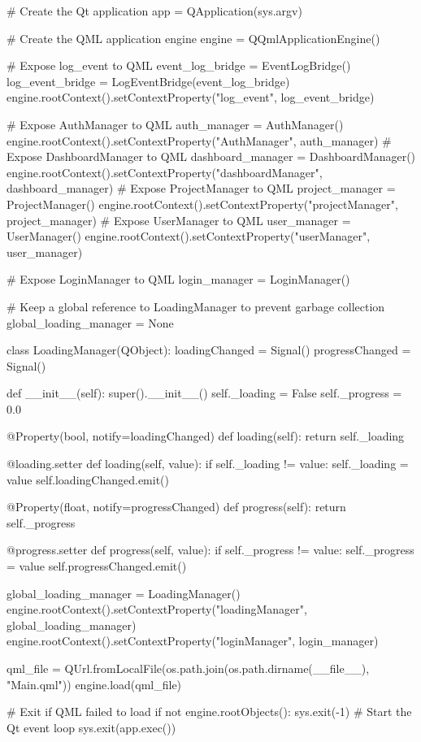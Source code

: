 \documentclass{report}
\begin{document}
\begin{python}
    # Create the Qt application
    app = QApplication(sys.argv)

    # Create the QML application engine
    engine = QQmlApplicationEngine()

    # Expose log_event to QML
    event_log_bridge = EventLogBridge()
    log_event_bridge = LogEventBridge(event_log_bridge)
    engine.rootContext().setContextProperty("log_event", log_event_bridge)

    # Expose AuthManager to QML
    auth_manager = AuthManager()
    engine.rootContext().setContextProperty("AuthManager", auth_manager)
    # Expose DashboardManager to QML
    dashboard_manager = DashboardManager()
    engine.rootContext().setContextProperty("dashboardManager", dashboard_manager)
    # Expose ProjectManager to QML
    project_manager = ProjectManager()
    engine.rootContext().setContextProperty("projectManager", project_manager)
    # Expose UserManager to QML
    user_manager = UserManager()
    engine.rootContext().setContextProperty("userManager", user_manager)

    # Expose LoginManager to QML
    login_manager = LoginManager()

# Keep a global reference to LoadingManager to prevent garbage collection
global_loading_manager = None

class LoadingManager(QObject):
    loadingChanged = Signal()
    progressChanged = Signal()

    def __init__(self):
        super().__init__()
        self._loading = False
        self._progress = 0.0

    @Property(bool, notify=loadingChanged)
    def loading(self):
        return self._loading

    @loading.setter
    def loading(self, value):
        if self._loading != value:
            self._loading = value
            self.loadingChanged.emit()

    @Property(float, notify=progressChanged)
    def progress(self):
        return self._progress

    @progress.setter
    def progress(self, value):
        if self._progress != value:
            self._progress = value
            self.progressChanged.emit()

global_loading_manager = LoadingManager()
engine.rootContext().setContextProperty("loadingManager", global_loading_manager)
engine.rootContext().setContextProperty("loginManager", login_manager)

qml_file = QUrl.fromLocalFile(os.path.join(os.path.dirname(__file__), "Main.qml"))
engine.load(qml_file)

# Exit if QML failed to load
if not engine.rootObjects():
    sys.exit(-1)
# Start the Qt event loop
sys.exit(app.exec())
\end{python}
\end{document}
